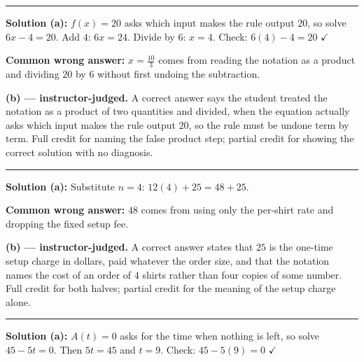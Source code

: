 \documentclass[12pt]{article}
\begin{document}
\vspace{0.2cm}\noindent\rule{\linewidth}{0.2pt}


\textbf{Solution (a):} $f(x) = 20$ asks which input makes the rule output $20$, so solve $6x - 4 = 20$. Add $4$: $6x = 24$. Divide by $6$: $x = 4$. Check: $6(4) - 4 = 20$ $\checkmark$ 

\textbf{Common wrong answer:} $x = \frac{10}{3}$ comes from reading the notation as a product and dividing $20$ by $6$ without first undoing the subtraction.

\textbf{(b) --- instructor-judged.} A correct answer says the student treated the notation as a product of two quantities and divided, when the equation actually asks which input makes the rule output $20$, so the rule must be undone term by term. Full credit for naming the false product step; partial credit for showing the correct solution with no diagnosis.

\vspace{0.2cm}\noindent\rule{\linewidth}{0.2pt}


\textbf{Solution (a):} Substitute $n = 4$: $12(4) + 25 = 48 + 25$. 

\textbf{Common wrong answer:} $48$ comes from using only the per-shirt rate and dropping the fixed setup fee.

\textbf{(b) --- instructor-judged.} A correct answer states that $25$ is the one-time setup charge in dollars, paid whatever the order size, and that the notation names the cost of an order of $4$ shirts rather than four copies of some number. Full credit for both halves; partial credit for the meaning of the setup charge alone.

\vspace{0.2cm}\noindent\rule{\linewidth}{0.2pt}


\textbf{Solution (a):} $A(t) = 0$ asks for the time when nothing is left, so solve $45 - 5t = 0$. Then $5t = 45$ and $t = 9$. Check: $45 - 5(9) = 0$ $\checkmark$ 
\end{document}
